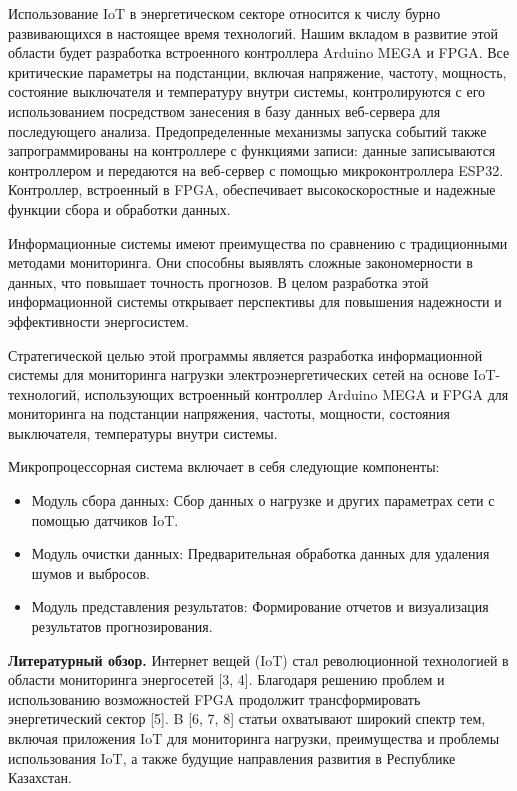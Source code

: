 Использование IoT в энергетическом секторе относится к числу бурно
развивающихся в настоящее время технологий. Нашим вкладом в развитие
этой области будет разработка встроенного контроллера Arduino MEGA и
FPGA. Все критические параметры на подстанции, включая напряжение,
частоту, мощность, состояние выключателя и температуру внутри системы,
контролируются с его использованием посредством занесения в базу данных
веб-сервера для последующего анализа. Предопределенные механизмы запуска
событий также запрограммированы на контроллере с функциями записи:
данные записываются контроллером и передаются на веб-сервер с помощью
микроконтроллера ESP32. Контроллер, встроенный в FPGA, обеспечивает
высокоскоростные и надежные функции сбора и обработки данных.

Информационные системы имеют преимущества по сравнению с традиционными
методами мониторинга. Они способны выявлять сложные закономерности в
данных, что повышает точность прогнозов. В целом разработка этой
информационной системы открывает перспективы для повышения надежности и
эффективности энергосистем.

Стратегической целью этой программы является разработка информационной
системы для мониторинга нагрузки электроэнергетических сетей на основе
IoT-технологий, использующих встроенный контроллер Arduino MEGA и FPGA
для мониторинга на подстанции напряжения, частоты, мощности, состояния
выключателя, температуры внутри системы.

Микропроцессорная система включает в себя следующие компоненты:

\begin{itemize}
\item
  Модуль сбора данных: Сбор данных о нагрузке и других параметрах сети с
  помощью датчиков IoT.
\item
  Модуль очистки данных: Предварительная обработка данных для удаления
  шумов и выбросов.
\item
  Модуль представления результатов: Формирование отчетов и визуализация
  результатов прогнозирования.
\end{itemize}

{\bfseries Литературный обзор.} Интернет вещей (IoT) стал революционной
технологией в области мониторинга энергосетей {[}3, 4{]}. Благодаря
решению проблем и использованию возможностей FPGA продолжит
трансформировать энергетический сектор {[}5{]}. B {[}6, 7, 8{]} статьи
охватывают широкий спектр тем, включая приложения IoT для мониторинга
нагрузки, преимущества и проблемы использования IoT, а также будущие
направления развития в Республике Казахстан.


